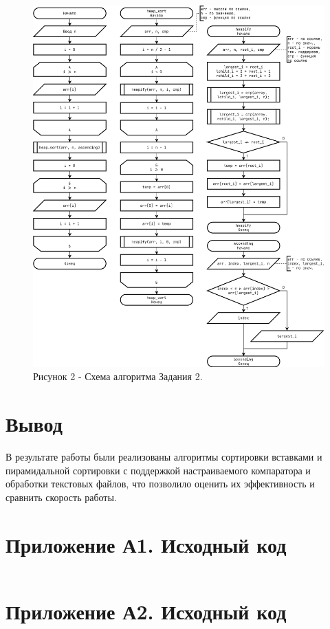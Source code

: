 \documentclass[oneside,a4paper,14pt]{extarticle}
\begin{document}
\begin{figure}[H]
	\centering
	\includegraphics[height=0.9\textheight]{pics/flowchart2.png}
	\caption*{Рисунок 2 - Схема алгоритма Задания 2.}
\end{figure}

\section*{Вывод}


В результате работы были реализованы алгоритмы сортировки вставками и пирамидальной сортировки с поддержкой настраиваемого компаратора и обработки текстовых файлов, что позволило оценить их эффективность и сравнить скорость работы.
\newpage
\section*{Приложение А1. Исходный код}
\inputminted{cpp}{code/heap_sort.c}

\section*{Приложение А2. Исходный код}
\inputminted{cpp}{code/insertion_sort.c}
\end{document}
